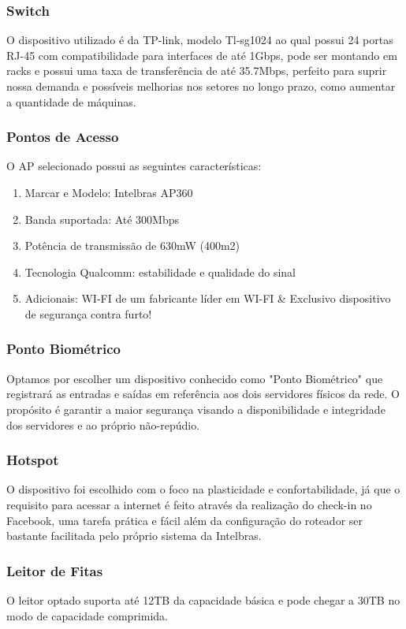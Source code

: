 \documentclass[12pt]{article}
\begin{document}
\subsubsection{Switch}
O dispositivo utilizado é da TP-link, modelo Tl-sg1024 ao qual possui 24 portas RJ-45 com compatibilidade para interfaces de até 1Gbps, pode ser montando em racks e possui uma taxa de transferência de até 35.7Mbps, perfeito para suprir nossa demanda e possíveis melhorias nos setores no longo prazo, como aumentar a quantidade de máquinas.

\subsubsection{Pontos de Acesso}
O AP selecionado possui as seguintes características:

\begin{enumerate}
    \item Marcar e Modelo: Intelbras AP360
    \item Banda suportada: Até 300Mbps
    \item Potência de transmissão de 630mW (400m2)
    \item Tecnologia Qualcomm: estabilidade e qualidade do sinal
    \item Adicionais: WI-FI de um fabricante líder em WI-FI \& Exclusivo dispositivo de segurança contra furto!
\end{enumerate}

\subsubsection{Ponto Biométrico}
Optamos por escolher um dispositivo conhecido como "Ponto Biométrico" que registrará as entradas e saídas em referência aos dois servidores físicos da rede. O propósito é garantir a maior segurança visando a disponibilidade e integridade dos servidores e ao próprio não-repúdio.

\subsubsection{Hotspot}
O dispositivo foi escolhido com o foco na plasticidade e confortabilidade, já que o requisito para acessar a internet é feito através da realização do check-in no Facebook, uma tarefa prática e fácil além da configuração do roteador ser bastante facilitada pelo próprio sistema da Intelbras.

\subsubsection{Leitor de Fitas}
O leitor optado suporta até 12TB da capacidade básica e pode chegar a 30TB no modo de capacidade comprimida.
\end{document}
